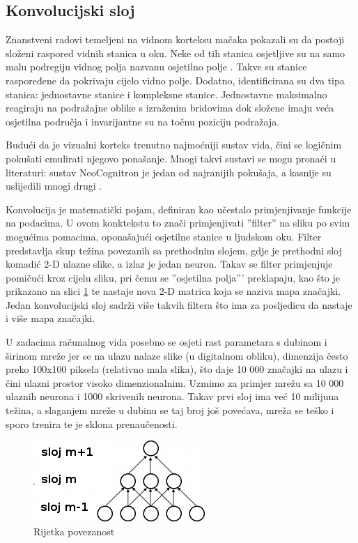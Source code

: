 \documentclass[times, utf8, diplomski, numeric]{fer}
\begin{document}
\subsection{Konvolucijski sloj}

Znanstveni radovi temeljeni na vidnom korteksu  mačaka pokazali su da postoji složeni raspored vidnih stanica u oku. Neke od tih stanica osjetljive su na samo malu podregiju vidnog polja nazvanu osjetilno polje . Takve su stanice raspoređene da pokrivaju cijelo vidno polje. Dodatno, identificirana su dva tipa stanica: jednostavne stanice i kompleksne stanice. Jednostavne maksimalno reagiraju na podražajne oblike s izraženim bridovima dok složene imaju veća osjetilna područja i invarijantne su na točnu poziciju podražaja.

Budući da je vizualni korteks trenutno najmoćniji sustav vida, čini se logičnim pokušati emulirati njegovo ponašanje. Mnogi takvi sustavi se mogu pronaći u literaturi: sustav NeoCognitron \cite{neocognitron} je jedan od najranijih pokušaja, a kasnije su uslijedili mnogi drugi \cite{cortex_mehachanism} \cite{gradient_document}.

Konvolucija je matematički pojam, definiran kao učestalo primjenjivanje funkcije na podacima. U ovom konktekstu to znači primjenjivati ''filter'' na sliku po svim mogućima pomacima, oponašajući osjetilne stanice u ljudskom oku. Filter predstavlja skup težina povezanih sa prethodnim slojem, gdje je prethodni sloj komadić 2-D ulazne slike, a izlaz je jedan neuron. Takav se filter primjenjuje pomičući kroz cijelu sliku, pri čemu se ''osjetilna polja''' preklapaju, kao što je prikazano na slici \ref{fig:sparse-nn} te nastaje nova 2-D matrica koja se naziva mapa značajki. Jedan konvolucijski sloj sadrži više takvih filtera što ima za posljedicu da nastaje i više mapa značajki.

U zadacima računalnog vida posebno se osjeti rast parametara s dubinom i širinom mreže jer se na ulazu nalaze slike (u digitalnom obliku), dimenzija često preko 100x100 piksela (relativno mala slika), što daje 10 000 značajki na ulazu i čini ulazni prostor visoko dimenzionalnim. Uzmimo za primjer mrežu sa 10 000 ulaznih neurona i 1000 skrivenih neurona. Takav prvi sloj ima već 10 milijuna težina, a slaganjem mreže u dubinu se taj broj još povećava, mreža se teško i sporo trenira te je sklona prenaučenosti.

\begin{figure}[htb]
\centering
\includegraphics[scale=0.8]{imgs/sparse_1D_nn.png}
\caption{Rijetka povezanost}
\label{fig:sparse-nn}
\end{figure}
\end{document}
